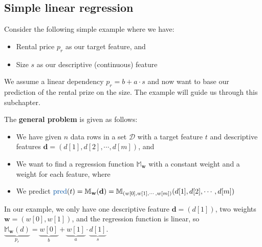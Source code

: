 \subsection{Simple linear regression}

\begin{note}
  Consider the following simple example where we have:
  \begin{itemize}
    \item Rental price $p_r$ as our target feature, and
    \item Size $s$ as our descriptive (continuous) feature
  \end{itemize}
  We assume a linear dependency $p_r = b + a \cdot s$ and now want to base our prediction of the rental prize on the size. The example will guide us through this subchapter.
\end{note}

The \textbf{general problem} is given as follows:
\begin{itemize}
  \item We have given $n$ data rows in a set $\mathcal{D}$ with a target feature $t$ and descriptive features $\mathbf{d} = (d[1], d[2], \cdots, d[m])$, and
  \item We want to find a regression function $\mathbb{M}_\mathbf{w}$ with a constant weight and a weight for each feature, where
  \item We predict $\text{\color{mathblue}pred}(t) = \mathbb{M}_\mathbf{w}(\mathbf{d}) = \mathbb{M}_{(w[0], w[1], \cdots, w[m])}(d[1], d[2], \cdots, d[m])$
\end{itemize}
\begin{note}
  In our example, we only have one descriptive feature $\mathbf{d}=(d[1])$, two weights $\mathbf{w}=(w[0], w[1])$, and the regression function is linear, so $\underbrace{\mathbb{M}_\mathbf{w}(d)}_{p_r} = \underbrace{w[0]}_{b} + \underbrace{w[1]}_{a}\cdot\underbrace{d[1]}_{s}$. 
\end{note}

